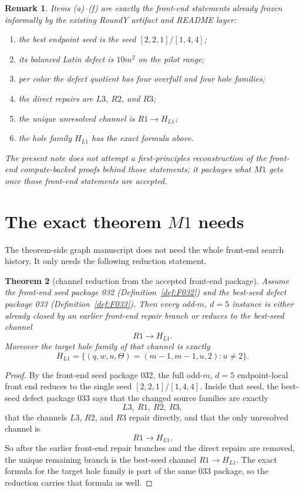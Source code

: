 \documentclass[11pt]{article}
\newtheorem{theorem}{Theorem}[section]
\newtheorem{remark}[theorem]{Remark}
\newcommand{\HLone}{H_{L1}}
\begin{document}
\begin{remark}
Items \textup{(a)}--\textup{(f)} are exactly the front-end statements already
frozen informally by the existing RoundY artifact and README layer:
\begin{enumerate}[label=\textup{(\roman*)},leftmargin=2.5em]
\item the best endpoint seed is the seed $[2,2,1]/[1,4,4]$;
\item its balanced Latin defect is $10m^2$ on the pilot range;
\item per color the defect quotient has four overfull and four hole families;
\item the direct repairs are $L3$, $R2$, and $R3$;
\item the unique unresolved channel is $R1\to \HLone$;
\item the hole family $\HLone$ has the exact formula above.
\end{enumerate}
The present note does not attempt a first-principles reconstruction of the
front-end compute-backed proofs behind those statements; it packages what $M1$
gets once those front-end statements are accepted.
\end{remark}

\section{The exact theorem $M1$ needs}

The theorem-side graph manuscript does not need the whole front-end search
history.
It only needs the following reduction statement.

\begin{theorem}[channel reduction from the accepted front-end package]
\label{thm:M1-from-front-end}
Assume the front-end seed package \textup{032}
(Definition~\ref{def:F032}) and the best-seed defect package \textup{033}
(Definition~\ref{def:F033}).
Then every odd-$m$, $d=5$ instance is either already closed by an earlier
front-end repair branch or reduces to the best-seed channel
\[
R1 \to \HLone.
\]
Moreover the target hole family of that channel is exactly
\[
\HLone
=\{(q,w,u,\Theta)=(m-1,m-1,u,2): u\neq 2\}.
\]
\end{theorem}

\begin{proof}
By the front-end seed package \textup{032}, the full odd-$m$, $d=5$
endpoint-local front end reduces to the single seed $[2,2,1]/[1,4,4]$.
Inside that seed, the best-seed defect package \textup{033} says that the
changed source families are exactly
\[
L3,\ R1,\ R2,\ R3,
\]
that the channels $L3$, $R2$, and $R3$ repair directly, and that the only
unresolved channel is
\[
R1 \to \HLone.
\]
So after the earlier front-end repair branches and the direct repairs are
removed, the unique remaining branch is the best-seed channel
$R1\to \HLone$.
The exact formula for the target hole family is part of the same
\textup{033} package, so the reduction carries that formula as well.
\end{proof}
\end{document}
